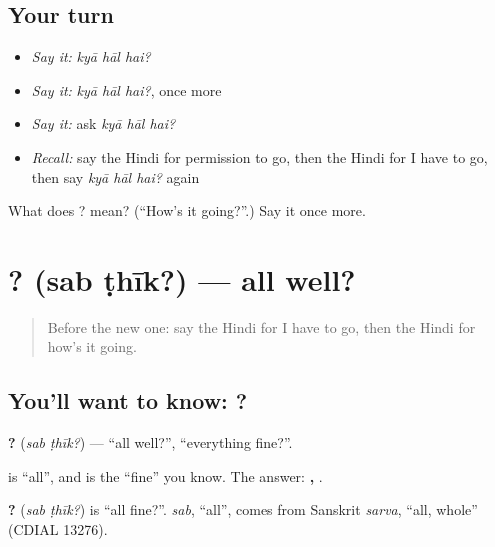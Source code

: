 \subsection*{Your turn}
\begin{itemize}
\raggedright
  \item \emph{Say it:} \emph{kyā hāl hai?}
  \item \emph{Say it:} \emph{kyā hāl hai?}, once more
  \item \emph{Say it:} ask \emph{kyā hāl hai?}
  \item \emph{Recall:} say the Hindi for permission to go, then the Hindi for I have to go, then say \emph{kyā hāl hai?} again
\end{itemize}

\begin{tcolorbox}[breakable,colback=teal!4,colframe=teal!35!black,title={Before you move on}]
What does   ? mean? (\textquotedblleft{}How's it going?\textquotedblright{}.) Say it once more.
\end{tcolorbox}
\section[\texorpdfstring{\hi{सब} \hi{ठीक}? (sab ṭhīk?)}{सब ठीक? (sab ṭhīk?)}]{ ? (sab ṭhīk?) — all well?}

\label{lesson:HI-C123-sabthik}



\begin{quote}
Before the new one: say the Hindi for I have to go, then the Hindi for how's it going.
\end{quote}

\subsection*{You'll want to know:  ?}
\textbf{ ?} (\emph{sab ṭhīk?}) — \textquotedblleft{}all well?\textquotedblright{}, \textquotedblleft{}everything fine?\textquotedblright{}.

\textbf{} is \textquotedblleft{}all\textquotedblright{}, and \textbf{} is the \textquotedblleft{}fine\textquotedblright{} you know. The answer: \textbf{,  }.

\begin{cousinweb}
\textbf{ ?} (\emph{sab ṭhīk?}) is \textquotedblleft{}all fine?\textquotedblright{}. \emph{sab}, \textquotedblleft{}all\textquotedblright{}, comes from Sanskrit \emph{sarva}, \textquotedblleft{}all, whole\textquotedblright{} (CDIAL 13276).
\end{cousinweb}

